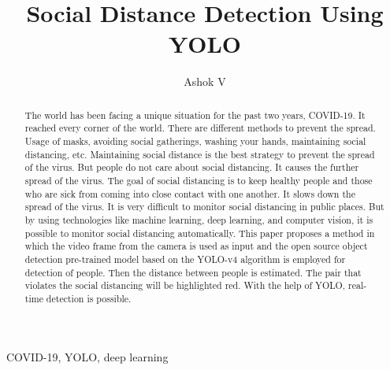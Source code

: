 \documentclass[conference]{IEEEtran}
\begin{document}
\title{Social Distance Detection Using YOLO\\
{}
}
\author{Ashok V}

\maketitle

\begin{abstract}
The world has been facing a unique situation for the past two years, COVID-19. It reached every corner of the world. There are different methods to prevent the spread. Usage of masks, avoiding social gatherings, washing your hands, maintaining social distancing, etc. Maintaining social distance is the best strategy to prevent the spread of the virus. But people do not care about social distancing. It causes the further spread of the virus. The goal of social distancing is to keep healthy people and those who are sick from coming into close contact with one another. It slows down the spread of the virus. It is very difficult to monitor social distancing in public places. But by using technologies like machine learning, deep learning, and computer vision, it is possible to monitor social distancing automatically. This paper proposes a method in which the video frame from the camera is used as input and the open source object detection pre-trained model based on the YOLO-v4 algorithm is employed for detection of people. Then the distance between people is estimated. The pair that violates the social distancing will be highlighted red. With the help of YOLO, real-time detection is possible. 
\end{abstract}

\begin{IEEEkeywords}
COVID-19, YOLO, deep learning
\end{IEEEkeywords}
\end{document}
